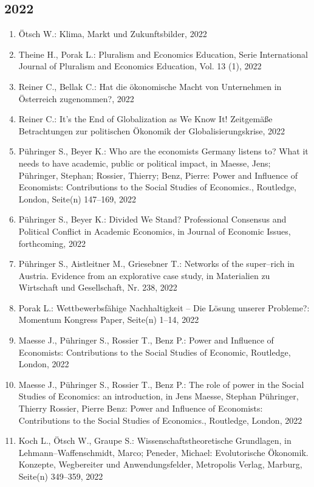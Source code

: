 \subsection*{2022}
\begin{enumerate}
    	 \item Ötsch W.: Klima, Markt und Zukunftsbilder, 2022
	 \item Theine H., Porak L.: Pluralism and Economics Education, Serie International Journal of Pluralism and Economics Education, Vol. 13 (1), 2022
	 \item Reiner C., Bellak C.: Hat die ökonomische Macht von Unternehmen in Österreich zugenommen?, 2022
	 \item Reiner C.: It’s the End of Globalization as We Know It! Zeitgemäße Betrachtungen zur politischen Ökonomik der Globalisierungskrise, 2022
	 \item Pühringer S., Beyer K.: Who are the economists Germany listens to? What it needs to have academic, public or political impact, in Maesse, Jens; Pühringer, Stephan; Rossier, Thierry; Benz, Pierre: Power and Influence of Economists: Contributions to the Social Studies of Economics., Routledge, London, Seite(n) 147--169, 2022
	 \item Pühringer S., Beyer K.: Divided We Stand? Professional Consensus and Political Conflict in Academic Economics, in Journal of Economic Issues, forthcoming, 2022
	 \item Pühringer S., Aistleitner M., Griesebner T.: Networks of the super--rich in Austria. Evidence from an explorative case study, in Materialien zu Wirtschaft und Gesellschaft, Nr. 238, 2022
	 \item Porak L.: Wettbewerbsfähige Nachhaltigkeit – Die Lösung unserer Probleme?: Momentum Kongress Paper, Seite(n) 1--14, 2022
	 \item Maesse J., Pühringer S., Rossier T., Benz P.: Power and Influence of Economists: Contributions to the Social Studies of Economic, Routledge, London, 2022
	 \item Maesse J., Pühringer S., Rossier T., Benz P.: The role of power in the Social Studies of Economics: an introduction, in Jens Maesse, Stephan Pühringer, Thierry Rossier,  Pierre Benz: Power and Influence of Economists: Contributions to the Social Studies of Economics., Routledge, London, 2022
	 \item Koch L., Ötsch W., Graupe S.: Wissenschaftstheoretische Grundlagen, in Lehmann--Waffenschmidt, Marco; Peneder, Michael: Evolutorische Ökonomik. Konzepte, Wegbereiter und Anwendungsfelder, Metropolis Verlag, Marburg, Seite(n) 349--359, 2022

\end{enumerate}
